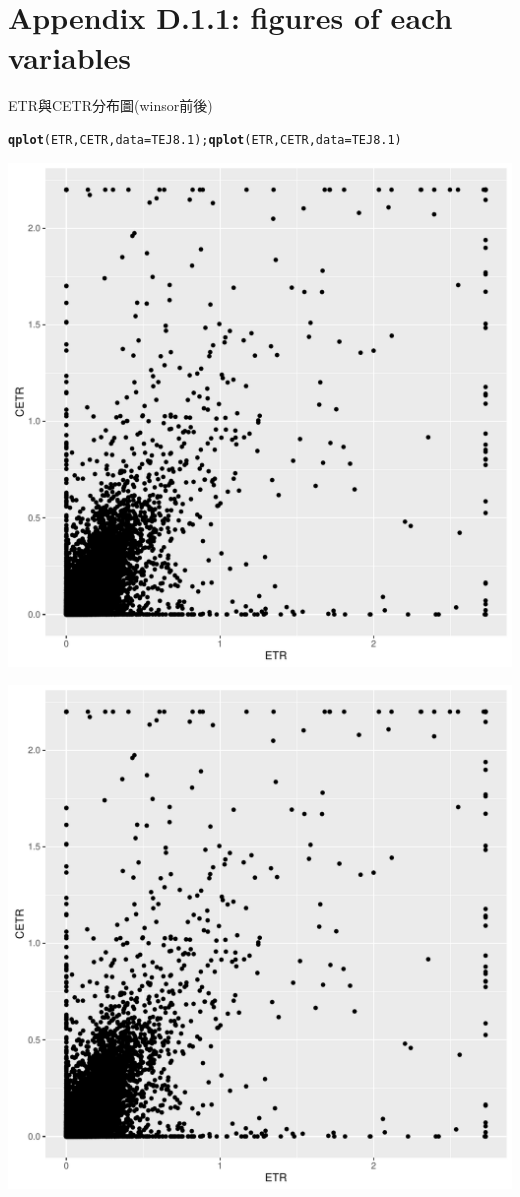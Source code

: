 \documentclass[a4paper]{article}\usepackage[]{graphicx}\usepackage[]{color}
\makeatletter
\def\maxwidth{ %
  \ifdim\Gin@nat@width>\linewidth
    \linewidth
  \else
    \Gin@nat@width
  \fi
}
\newcommand{\hlstd}[1]{\textcolor[rgb]{0.345,0.345,0.345}{#1}}%
\newcommand{\hlkwc}[1]{\textcolor[rgb]{0.333,0.667,0.333}{#1}}%
\newcommand{\hlkwd}[1]{\textcolor[rgb]{0.737,0.353,0.396}{\textbf{#1}}}%
\newenvironment{kframe}{%
 \def\at@end@of@kframe{}%
 \ifinner\ifhmode%
  \def\at@end@of@kframe{\end{minipage}}%
  \begin{minipage}{\columnwidth}%
 \fi\fi%
 \def\FrameCommand##1{\hskip\@totalleftmargin \hskip-\fboxsep
 \colorbox{shadecolor}{##1}\hskip-\fboxsep
     \hskip-\linewidth \hskip-\@totalleftmargin \hskip\columnwidth}%
 \MakeFramed {\advance\hsize-\width
   \@totalleftmargin\z@ \linewidth\hsize
   \@setminipage}}%
 {\par\unskip\endMakeFramed%
 \at@end@of@kframe}
\makeatother
\begin{document}
\section{\\Appendix D.1.1: figures of each variables} \label{App:Appendix D.1.1}
ETR與CETR分布圖(winsor前後)\\
\begin{kframe}
\begin{alltt}
\hlkwd{qplot}\hlstd{(ETR,CETR,}\hlkwc{data}\hlstd{=TEJ8.1);}\hlkwd{qplot}\hlstd{(ETR,CETR,}\hlkwc{data}\hlstd{=TEJ8.1)}
\end{alltt}
\end{kframe}
\includegraphics[width=\maxwidth]{figure/unnamed-chunk-2-1} 

\includegraphics[width=\maxwidth]{figure/unnamed-chunk-2-2} 
\end{document}
